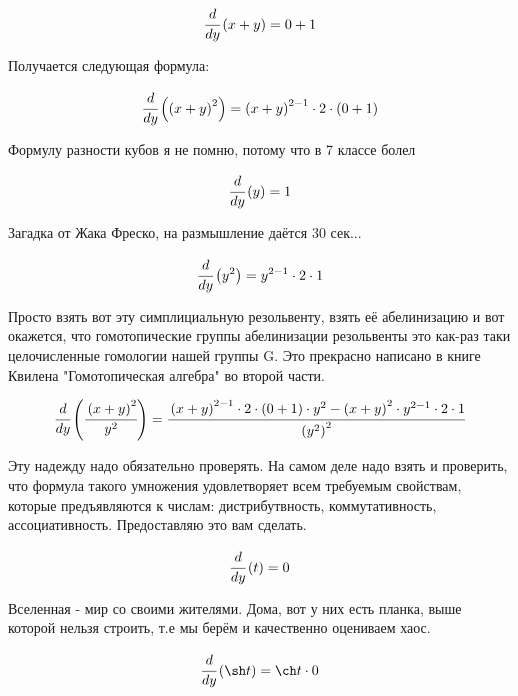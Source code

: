 \begin{dmath}
 \cfrac{d}{d y} \left( x + y \right) = 0 + 1 
\end{dmath}


Получается следующая формула:


\begin{dmath}
 \cfrac{d}{d y} \left( \left(x + y\right)^{2} \right) = \left(x + y\right)^{2 - 1} \cdot 2 \cdot \left(0 + 1\right) 
\end{dmath}


Формулу разности кубов я не помню, потому что в 7 классе болел


\begin{dmath}
 \cfrac{d}{d y} \left( y \right) = 1 
\end{dmath}


Загадка от Жака Фреско, на размышление даётся 30 сек...


\begin{dmath}
 \cfrac{d}{d y} \left( y^{2} \right) = y^{2 - 1} \cdot 2 \cdot 1 
\end{dmath}


Просто взять вот эту симплициальную резольвенту, взять её абелинизацию и вот окажется, что гомотопические группы абелинизации резольвенты это как-раз таки целочисленные гомологии нашей группы G. Это прекрасно написано в книге Квилена "Гомотопическая алгебра" во второй части.


\begin{dmath}
 \cfrac{d}{d y} \left( \cfrac{\left(x + y\right)^{2}}{y^{2}} \right) = \cfrac{\left(x + y\right)^{2 - 1} \cdot 2 \cdot \left(0 + 1\right) \cdot y^{2} - \left(x + y\right)^{2} \cdot y^{2 - 1} \cdot 2 \cdot 1}{\left(y^{2}\right)^{2}} 
\end{dmath}


Эту надежду надо обязательно проверять. На самом деле надо взять и проверить, что формула такого умножения удовлетворяет всем требуемым свойствам, которые предъявляются к числам: дистрибутвность, коммутативность, ассоциативность. Предоставляю это вам сделать.


\begin{dmath}
 \cfrac{d}{d y} \left( t \right) = 0 
\end{dmath}


Вселенная - мир со своими жителями. Дома, вот у них есть планка, выше которой нельзя строить, т.е мы берём и качественно оцениваем хаос. 


\begin{dmath}
 \cfrac{d}{d y} \left( \sh t \right) = \ch t \cdot 0 
\end{dmath}


